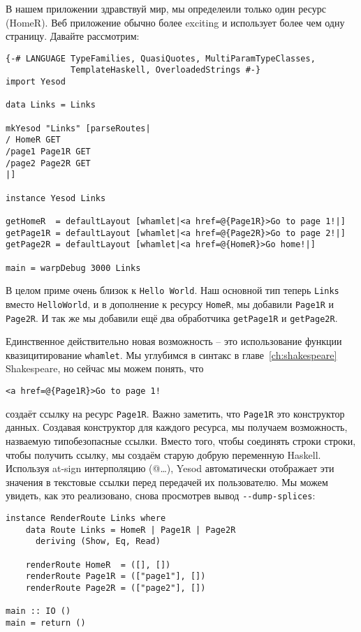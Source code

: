 В нашем приложении здравствуй мир, мы определеили только один ресурс (HomeR).
Веб приложение обычно более exciting и использует более чем одну страницу. Давайте рассмотрим:

\begin{lstlisting}
{-# LANGUAGE TypeFamilies, QuasiQuotes, MultiParamTypeClasses,
             TemplateHaskell, OverloadedStrings #-}
import Yesod

data Links = Links

mkYesod "Links" [parseRoutes|
/ HomeR GET
/page1 Page1R GET
/page2 Page2R GET
|]

instance Yesod Links

getHomeR  = defaultLayout [whamlet|<a href=@{Page1R}>Go to page 1!|]
getPage1R = defaultLayout [whamlet|<a href=@{Page2R}>Go to page 2!|]
getPage2R = defaultLayout [whamlet|<a href=@{HomeR}>Go home!|]

main = warpDebug 3000 Links
\end{lstlisting}

В целом приме очень близок к \lstinline'Hello World'. Наш основной тип теперь 
\lstinline'Links' вместо \lstinline'HelloWorld', и в дополнение к ресурсу \lstinline'HomeR', мы 
добавили \lstinline'Page1R' и \lstinline'Page2R'. И так же мы добавили ещё 
два обработчика \lstinline'getPage1R' и \lstinline'getPage2R'.

Единственное действительно новая возможность -- это использование функции 
квазицитирование \lstinline'whamlet'. Мы углубимся в синтакс в главе~\ref{ch:shakespeare} Shakespeare, 
но сейчас мы можем понять, что

\begin{lstlisting}
<a href=@{Page1R}>Go to page 1!
\end{lstlisting}

создаёт ссылку на ресурс \lstinline'Page1R'. Важно заметить, что \lstinline'Page1R' это конструктор 
данных. Создавая конструктор для каждого ресурса, мы получаем возможность, назваемую типобезопасные ссылки.
Вместо того, чтобы соединять строки строки, чтобы получить ссылку, мы создаём старую добрую 
переменную Haskell.
Используя at-sign интерполяцию (@{\ldots}), Yesod автоматически отображает
эти значения в текстовые ссылки перед передачей их пользователю. Мы можем увидеть, как это
реализовано, снова просмотрев вывод \lstinline'--dump-splices':

\begin{lstlisting}
instance RenderRoute Links where
    data Route Links = HomeR | Page1R | Page2R
      deriving (Show, Eq, Read)

    renderRoute HomeR  = ([], [])
    renderRoute Page1R = (["page1"], [])
    renderRoute Page2R = (["page2"], [])

main :: IO ()
main = return ()
\end{lstlisting}

